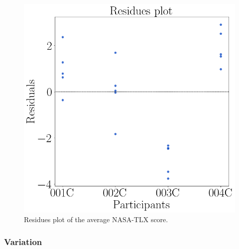 \begin{figure}[!htb]
\begin{minipage}{0.45\linewidth}
            \includegraphics[width = \linewidth]{Resultados/Nasa/Figuras/png/residplot_nasa_avg.png}
            \caption{Residues plot of the average NASA-TLX score.}
            \label{fig:residual_sdnn_average}
        \end{minipage}
    \end{figure}

    \subsubsection{Variation}

